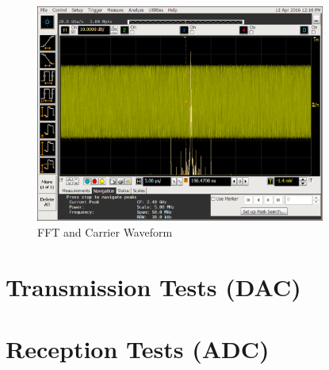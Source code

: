 \begin{figure}[htbp]
    \centering
    \includegraphics[width=0.85\textwidth]{./figures/oscill_fft}
    \caption{ FFT and Carrier Waveform
    \label{fig:oscillfft}}
\end{figure}



\section{Transmission Tests (DAC)}
\label{result:dac}

\section{Reception Tests (ADC)}
\label{result:adc}
